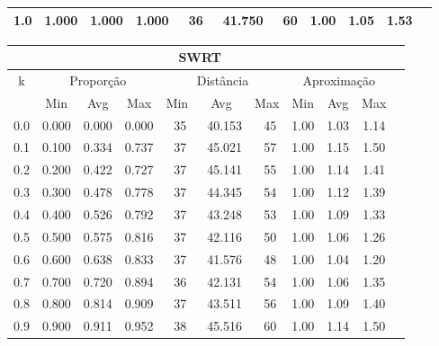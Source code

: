 \begin{table}[!p]
\begin{center}
{\begin{tabular}{|c|c|c|c|c|c|c|c|c|c|c|}
1.0                & 1.000     & 1.000    & 1.000    & ~36      & ~41.750  & ~60     & 1.00    & 1.05   & 1.53            \\ \hline
\end{tabular}%
\vspace{5pt}
\begin{tabular}{|c|c|c|c|c|c|c|c|c|c|c|}
\hline
\multicolumn{10}{|c|}{\bf SWRT}                                                                                           \\ \hline
\multirow{2}{*}{k} & \multicolumn{3}{c|}{Proporção}  & \multicolumn{3}{c|}{Distância} & \multicolumn{3}{c|}{Aproximação}  \\ \cline{2-10}
                   & Min       & Avg      & Max      & Min      & Avg      & Max     & Min     & Avg    & Max             \\ \hline
0.0                & 0.000     & 0.000    & 0.000    & ~35      & ~40.153  & ~45     & 1.00    & 1.03   & 1.14            \\ \hline
0.1                & 0.100     & 0.334    & 0.737    & ~37      & ~45.021  & ~57     & 1.00    & 1.15   & 1.50            \\ \hline
0.2                & 0.200     & 0.422    & 0.727    & ~37      & ~45.141  & ~55     & 1.00    & 1.14   & 1.41            \\ \hline
0.3                & 0.300     & 0.478    & 0.778    & ~37      & ~44.345  & ~54     & 1.00    & 1.12   & 1.39            \\ \hline
0.4                & 0.400     & 0.526    & 0.792    & ~37      & ~43.248  & ~53     & 1.00    & 1.09   & 1.33            \\ \hline
0.5                & 0.500     & 0.575    & 0.816    & ~37      & ~42.116  & ~50     & 1.00    & 1.06   & 1.26            \\ \hline
0.6                & 0.600     & 0.638    & 0.833    & ~37      & ~41.576  & ~48     & 1.00    & 1.04   & 1.20            \\ \hline
0.7                & 0.700     & 0.720    & 0.894    & ~36      & ~42.131  & ~54     & 1.00    & 1.06   & 1.35            \\ \hline
0.8                & 0.800     & 0.814    & 0.909    & ~37      & ~43.511  & ~56     & 1.00    & 1.09   & 1.40            \\ \hline
0.9                & 0.900     & 0.911    & 0.952    & ~38      & ~45.516  & ~60     & 1.00    & 1.14   & 1.50            \\ \hline

\end{tabular}}
\end{center}
\end{table}
